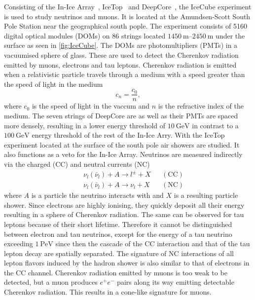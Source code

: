 Consisting of the In-Ice Array~\cite{In-Ice}, IceTop~\cite{IceTop} and DeepCore~\cite{DeepCore}, the IceCube experiment is used to study neutrinos and muons. It is located at the Amundsen-Scott South Pole Station near the geographical south pople. The experiment consists of 5160 digital optical modules (DOMs) on 86 strings located $\SIrange{1450}{2450}{\metre}$ under the surface as seen in \autoref{fig:IceCube}. The DOMs are photomultipliers (PMTs) in a vacuumised sphere of glass. These are used to detect the Cherenkov radiation emitted by muons, electrons and tau leptons. Cherenkov radiation is emitted when a relativistic particle travels through a medium with a speed greater than the speed of light in the medium
\begin{equation*}
  c_n = \frac{c_0}{n},
\end{equation*}
where $c_0$ is the speed of light in the vaccum and $n$ is the refractive index of the medium.
The seven strings of DeepCore are as well as their PMTs are spaced more densely, resulting in a lower energy threshold of $\SI{10}{\giga\electronvolt}$ in contrast to a $\SI{100}{\giga\electronvolt}$ energy threshold of the rest of the In-Ice Arry. With the IceTop experiment located at the surface of the south pole air showers are studied. It also functions as a veto for the In-Ice Array.
Neutrinos are measured indirectly via the charged (CC) and neutral currents (NC)
\begin{align*}
&&  \nu_l(\bar{\nu}_l) + A \to l^{\pm} + X && \mathrm{(CC)}\\
&&  \nu_l(\bar{\nu}_l) + A \to \nu_l + X && \mathrm{(NC)}
\end{align*}
where $A$ is a particle the neutrino interacts with and $X$ is a resulting particle shower. Since electrons are highly ionising, they quickly deposit all their energy resulting in a sphere of Cherenkov radiation. The same can be observed for tau leptons because of their short lifetime. Therefore it cannot be distinguished between electron and tau neutrinos, except for the energy of a tau neutrino exceeding $\SI{1}{\peta\electronvolt}$ since then the cascade of the CC interaction and that of the tau lepton decay are spatially separated.
The signature of NC interactions of all lepton flavors induced by the hadron shower is also similar to that of electrons in the CC channel.
Cherenkov radiation emitted by muons is too weak to be detected, but a muon produces $e^+ e^-$ pairs along its way emitting detectable Cherenkov radiation. This results in a cone-like signature for muons.\\

